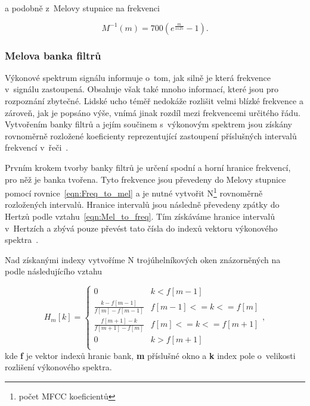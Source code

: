 \noindent a podobně z~Melovy stupnice na frekvenci

\begin{equation}
\label{eqn:Mel_to_freq}
    M^{-1}(m) = 700(e^{\frac{m}{1125}}-1).
\end{equation}

\subsubsection{Melova banka filtrů}
Výkonové spektrum signálu informuje o~tom, jak silně je která frekvence v~signálu zastoupená. Obsahuje však také mnoho informací, které jsou pro rozpoznání zbytečné. Lidské ucho téměř nedokáže rozlišit velmi blízké frekvence a zároveň, jak je popsáno výše, vnímá jinak rozdíl mezi frekvencemi určitého řádu. Vytvořením banky filtrů a jejím součinem s~výkonovým spektrem jsou získány rovnoměrně rozložené koeficienty reprezentující zastoupení příslušných intervalů frekvencí v~řeči~\cite{lyons_mfcc}.

Prvním krokem tvorby banky filtrů je určení spodní a horní hranice frekvencí, pro něž je banka tvořena. Tyto frekvence jsou převedeny do Melovy stupnice pomocí rovnice~\ref{eqn:Freq_to_mel} a je nutné vytvořit N\footnote{počet MFCC koeficientů} rovnoměrně rozložených intervalů. Hranice intervalů jsou následně převedeny zpátky do Hertzů podle vztahu~\ref{eqn:Mel_to_freq}. Tím získáváme hranice intervalů v~Hertzích a zbývá pouze převést tato čísla do indexů vektoru výkonového spektra~\cite{lyons_mfcc}.

Nad získanými indexy vytvoříme N trojúhelníkových oken znázorněných na~ podle následujícího vztahu

\begin{equation}
    \label{eqn:Mel_filter}
    H_m[k] = \begin{cases}
                0                                 & k < f[m -1]\\
                \frac{k - f[m - 1]}{f[m] - f[m - 1]}    & f[m - 1] <= k <= f[m]\\
                \frac{f[m + 1] - k}{f[m + 1] - f[m]}    & f[m] <= k <= f[m + 1]\\
                0                                 & k > f[m + 1]\\
               \end{cases},
\end{equation}
kde \textbf{f} je vektor indexů hranic bank, \textbf{m} příslušné okno a \textbf{k} index pole o~velikosti rozlišení výkonového spektra.

